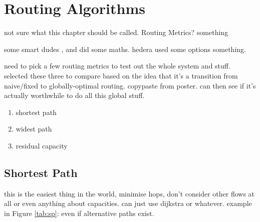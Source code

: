 \chapter{Routing Algorithms}

not sure what this chapter should be called. Routing Metrics? something

some smart dudes \cite{bonsma:ufp}, \cite{anag:mazing} and \cite{chakrabarti:ufp} did some maths. hedera used some options something.

need to pick a few routing metrics to test out the whole system and stuff. selected these three to compare based on the idea that it's a transition from naive/fixed to globally-optimal routing. copypaste from poster. can then see if it's actually worthwhile to do all this global stuff.

\begin{enumerate}
  \item shortest path
  \item widest path
  \item residual capacity
\end{enumerate}

\section{Shortest Path}
this is the easiest thing in the world, minimise hops, don't consider other flows at all or even anything about capacities. can just use dijkstra or whatever. example in Figure \ref{tab:sp}: even if alternative paths exist.

%
%

